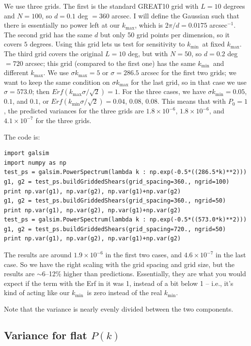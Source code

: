 \documentclass[preprint]{aastex}
\newcommand{\kmax}{\ensuremath{k_\mathrm{max}}}
\newcommand{\kmin}{\ensuremath{k_\mathrm{min}}}
\begin{document}
We use three grids. The first is the standard GREAT10 grid with $L=10$
degrees and $N=100$, so $d=0.1$ deg $=360$ arcsec.  I will define the
Gaussian such that there is essentially no power left at our \kmax,
which is $2\pi/d=0.0175$ arcsec$^{-1}$.  The second grid has the same
$d$ but only 50 grid points per dimension, so it covers $5$ degrees.
Using this grid lets us test for sensitivity to \kmin\ at fixed \kmax.
The third grid covers the original $L=10$ deg, but with $N=50$, so
$d=0.2$ deg $=720$ arcsec; this grid (compared to the first one) has
the same \kmin\ and different \kmax. We use $\sigma \kmax=5$ or
$\sigma=286.5$ 
arcsec for the first two grids; we want to keep the same condition on
$\sigma\kmax$ for the last grid, so in that case we use
$\sigma=573.0$; then $Erf(\kmax\sigma/\sqrt{2})=1$.  For the three cases, we have $\sigma\kmin=0.05$,
$0.1$, and $0.1$, or $Erf(\kmin\sigma/\sqrt{2})=0.04$, $0.08$,
$0.08$.  This means that with $P_0=1$, the predicted variances for the
three grids are $1.8\times 10^{-6}$, $1.8\times 10^{-6}$, and
$4.1\times 10^{-7}$ for the three grids.

The code is:
\begin{verbatim}
import galsim
import numpy as np
test_ps = galsim.PowerSpectrum(lambda k : np.exp(-0.5*((286.5*k)**2)))
g1, g2 = test_ps.buildGriddedShears(grid_spacing=360., ngrid=100)
print np.var(g1), np.var(g2), np.var(g1)+np.var(g2)
g1, g2 = test_ps.buildGriddedShears(grid_spacing=360., ngrid=50)
print np.var(g1), np.var(g2), np.var(g1)+np.var(g2)
test_ps = galsim.PowerSpectrum(lambda k : np.exp(-0.5*((573.0*k)**2)))
g1, g2 = test_ps.buildGriddedShears(grid_spacing=720., ngrid=50)
print np.var(g1), np.var(g2), np.var(g1)+np.var(g2)
\end{verbatim}

The results are around $1.9\times 10^{-6}$ in the first two cases, and
$4.6\times 10^{-7}$ in the last case.  So we have the right scaling
with the grid spacing and grid size, but the results are $\sim 6$--12\%
higher than predictions. Essentially, they are what you would expect
if the term with the Erf in it was 1, instead of a bit below 1 --
i.e., it's kind of acting like our \kmin\ is zero instead of the real
\kmin.

Note that the variance is nearly evenly divided between the two components.

\subsection{Variance for flat $P(k)$}
\end{document}
